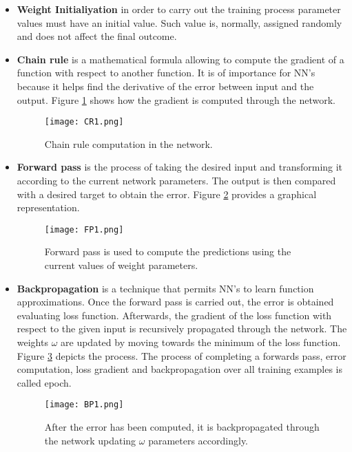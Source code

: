 \begin{itemize}
\item \textbf{Weight Initialiyation} in order to carry out the training process parameter values must have an initial value. Such value is, normally, assigned  randomly and does not affect the final outcome.

\item \textbf{Chain rule} is a mathematical formula allowing to compute the gradient of a function with respect to another function. It is of importance for NN's because it helps find the derivative of the error between input and the output. Figure \ref{fig:CRim1} shows how the  gradient is computed through the network.

\begin{figure}[!tb] 
\centering 
\texttt{[image: CR1.png]} 
\caption[Chain rule in neural networks]{Chain rule computation in the network.}
\label{fig:CRim1} 
\end{figure}

\item \textbf{Forward pass} is the process of taking the desired input and transforming it according to the current network parameters. The output is then compared with a desired target to obtain the error. Figure \ref{fig:FPim1} provides a graphical representation. 

\begin{figure}[!tb] 
\centering 
\texttt{[image: FP1.png]} 
\caption[Forward pass to compute error]{Forward pass is used to compute the predictions using the current values of weight parameters.}
\label{fig:FPim1} 
\end{figure}

\item \textbf{Backpropagation} is a technique that permits NN's to learn function approximations. Once the forward pass is carried out, the error is obtained evaluating loss function. Afterwards,  the gradient of the loss function with respect to the given input is recursively propagated through the network. The weights $\omega$ are updated by moving towards the minimum of the loss function. Figure \ref{fig:BPim1} depicts the process. The process of completing a forwards pass, error computation, loss gradient and backpropagation over all training examples is called epoch. 

\begin{figure}[!tb] 
\centering 
\texttt{[image: BP1.png]} 
\caption[Backpropagation process through the network]{After the error has been computed, it is backpropagated through the network updating $\omega$ parameters accordingly.}
\label{fig:BPim1} 
\end{figure} 	


\end{itemize}
